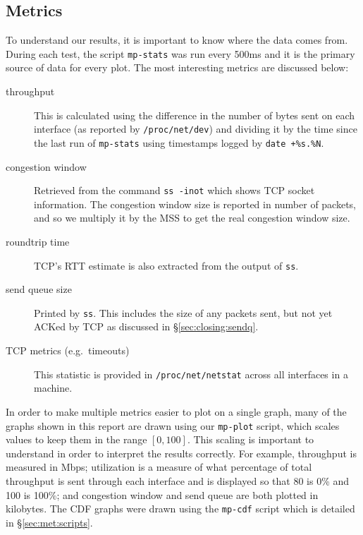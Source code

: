 \subsection{Metrics}
\label{sec:met:metrics}
To understand our results, it is important to know where the data comes from.
During each test, the script \texttt{mp-stats} was run every 500ms and it is the
primary source of data for every plot. The most interesting metrics are
discussed below:

\begin{description}
  \item[throughput]
    This is calculated using the difference in the number of bytes sent on each
    interface (as reported by \texttt{/proc\-/net/\-dev}) and dividing it by the
    time since the last run of \texttt{mp-stats} using timestamps logged by
    \texttt{date +\%s.\%N}.
  \item[congestion window]
    Retrieved from the command \texttt{ss -inot} which shows TCP socket
    information. The congestion window size is reported in number of packets,
    and so we multiply it by the MSS to get the real congestion window size.
  \item[roundtrip time]
    TCP's RTT estimate is also extracted from the output of \texttt{ss}.
  \item[send queue size]
    Printed by \texttt{ss}. This includes the size of any packets sent, but not
    yet ACKed by TCP as discussed in \S\ref{sec:closing:sendq}.
  \item[TCP metrics (e.g.\ timeouts)]
    This statistic is provided in \texttt{/proc\-/net/\-netstat} across all
    interfaces in a machine.
\end{description}

In order to make multiple metrics easier to plot on a single graph, many of the
graphs shown in this report are drawn using our \texttt{mp-plot} script, which
scales values to keep them in the range $[0,100]$. This scaling is important to
understand in order to interpret the results correctly. For example, throughput
is measured in Mbps; utilization is a measure of what percentage of total
throughput is sent through each interface and is displayed so that 80 is 0\% and
100 is 100\%; and congestion window and send queue are both plotted in
kilobytes. The CDF graphs were drawn using the \texttt{mp-cdf} script which is
detailed in \S\ref{sec:met:scripts}.
